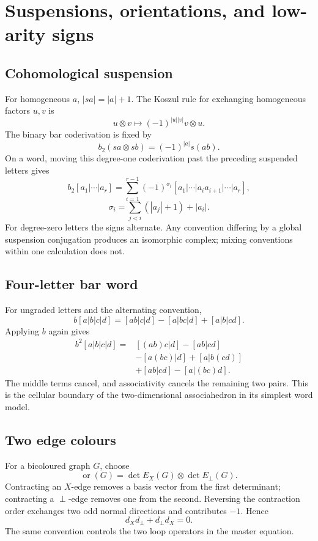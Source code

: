 \chapter{Suspensions, orientations, and low-arity signs}\label{app:signs}

\section{Cohomological suspension}
For homogeneous \(a\), \(|sa|=|a|+1\).  The Koszul rule for exchanging homogeneous factors \(u,v\) is
\[
 u\otimes v\longmapsto(-1)^{|u||v|}v\otimes u.
\]
The binary bar coderivation is fixed by
\[
 b_2(sa\otimes sb)=(-1)^{|a|}s(ab).
\]
On a word, moving this degree-one coderivation past the preceding suspended letters gives
\[
 b_2[a_1|\cdots|a_r]
 =\sum_{i=1}^{r-1}
 (-1)^{\sigma_i}
 [a_1|\cdots|a_ia_{i+1}|\cdots|a_r],
\]
\[
 \sigma_i=\sum_{j<i}(|a_j|+1)+|a_i|.
\]
For degree-zero letters the signs alternate.  Any convention differing by a global suspension conjugation produces an isomorphic complex; mixing conventions within one calculation does not.

\section{Four-letter bar word}
For ungraded letters and the alternating convention,
\[
 b[a|b|c|d]
 =[ab|c|d]-[a|bc|d]+[a|b|cd].
\]
Applying \(b\) again gives
\begin{align*}
 b^2[a|b|c|d]
 ={}&[(ab)c|d]-[ab|cd]\\
 &-[a(bc)|d]+[a|b(cd)]\\
 &+[ab|cd]-[a|(bc)d].
\end{align*}
The middle terms cancel, and associativity cancels the remaining two pairs.  This is the cellular boundary of the two-dimensional associahedron in its simplest word model.

\section{Two edge colours}
For a bicoloured graph \(G\), choose
\[
 \operatorname{or}(G)=\det E_X(G)\otimes\det E_\perp(G).
\]
Contracting an \(X\)-edge removes a basis vector from the first determinant; contracting a \(\perp\)-edge removes one from the second.  Reversing the contraction order exchanges two odd normal directions and contributes \(-1\).  Hence
\[
 d_Xd_\perp+d_\perp d_X=0.
\]
The same convention controls the two loop operators in the master equation.

